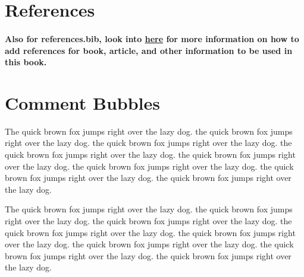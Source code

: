 \section*{References}

\paragraph{
    Also for references.bib, look into \href{https://www.overleaf.com/learn/latex/Bibliography_management_with_bibtex}{here} for more information on how to add references for book, article, and other information to be used in this book.
}

\newpage

\section*{Comment Bubbles}

\colorbox{commentcolor}{\parbox{.25\textwidth}{
    The quick brown fox jumps right over the lazy dog. the quick brown fox jumps right over the lazy dog. the quick brown fox jumps right over the lazy dog. the quick brown fox jumps right over the lazy dog. the quick brown fox jumps right over the lazy dog. the quick brown fox jumps right over the lazy dog. the quick brown fox jumps right over the lazy dog. the quick brown fox jumps right over the lazy dog.
}}

\colorbox{alertcolor}{\parbox{.25\textwidth}{
    The quick brown fox jumps right over the lazy dog. the quick brown fox jumps right over the lazy dog. the quick brown fox jumps right over the lazy dog. the quick brown fox jumps right over the lazy dog. the quick brown fox jumps right over the lazy dog. the quick brown fox jumps right over the lazy dog. the quick brown fox jumps right over the lazy dog. the quick brown fox jumps right over the lazy dog.
}}